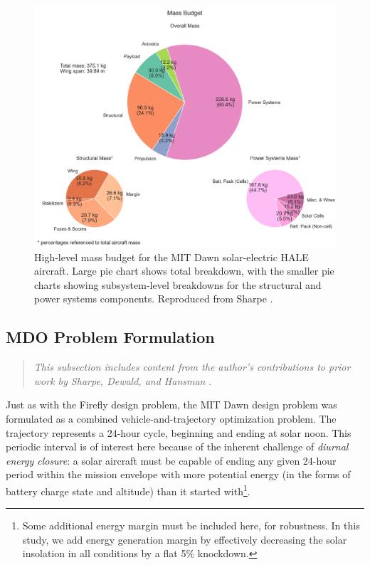 \begin{figure}[h]
    \centering
    \includegraphics[width=\textwidth]{../figures/dawnfigures/Mass_breakdown_baseline.png}
    \caption{High-level mass budget for the MIT Dawn solar-electric HALE aircraft. Large pie chart shows total breakdown, with the smaller pie charts showing subsystem-level breakdowns for the structural and power systems components. Reproduced from Sharpe \cite{sharpe_optimization_2021}.}
    \label{fig:dawn_mass_budget}
\end{figure}

\subsection{MDO Problem Formulation}
\label{sec:dawn-mdo}

\begin{quote}
    \emph{This subsection includes content from the author's contributions to prior work by Sharpe, Dewald, and Hansman} \cite{sharpe_optimization_2021}.
\end{quote}

Just as with the Firefly design problem, the MIT Dawn design problem was formulated as a combined vehicle-and-trajectory optimization problem. The trajectory represents a 24-hour cycle, beginning and ending at solar noon. This periodic interval is of interest here because of the inherent challenge of \emph{diurnal energy closure}: a solar aircraft must be capable of ending any given 24-hour period within the mission envelope with more potential energy (in the forms of battery charge state and altitude) than it started with\footnote{Some additional energy margin must be included here, for robustness. In this study, we add energy generation margin by effectively decreasing the solar insolation in all conditions by a flat 5\% knockdown.}.

